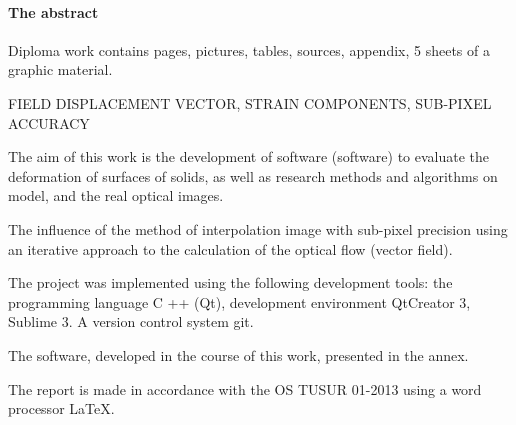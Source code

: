 \newpage
{}
\paragraph{\hfill The abstract \hfill}
Diploma work contains  pages,  pictures,  tables,  sources,  appendix, 5 sheets of a graphic material.

FIELD DISPLACEMENT VECTOR, STRAIN COMPONENTS, SUB-PIXEL ACCURACY

The aim of this work is the development of software (software) to evaluate the deformation of surfaces of solids, as well as research methods and algorithms on model, and the real optical images.

The influence of the method of interpolation image with sub-pixel precision using an iterative approach to the calculation of the optical flow (vector field).


The project was implemented using the following development tools: the programming language C ++ (Qt), development environment QtCreator 3, Sublime 3. A version control system git.

The software, developed in the course of this work, presented in the annex.

The report is made in accordance with the OS TUSUR 01-2013 using a word processor \LaTeX.